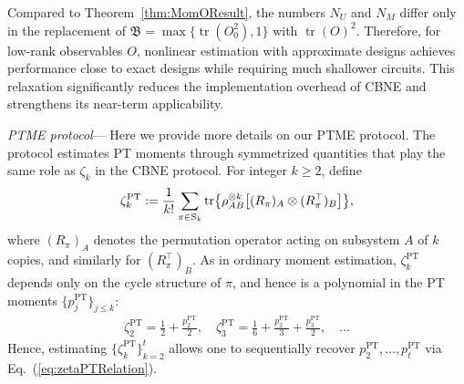\documentclass[aps,prl,twocolumn,nofootinbib,superscriptaddress,10pt]{revtex4-2}
\let\originalleft\left
\let\originalright\right
\renewcommand{\left}{\mathopen{}\mathclose\bgroup\originalleft}
\renewcommand{\right}{\aftergroup\egroup\originalright}
\DeclareMathOperator{\Tr}{tr}
\theoremstyle{plain}
\theoremstyle{definition}
\newcommand{\PT}{\mathrm{PT}}
\newcommand{\eref}[1]{Eq.~\textup{(\ref{#1})}}
\newcommand{\tref}[1]{Theorem~\ref{#1}}
\begin{document}
Compared to \tref{thm:MomOResult}, the numbers $N_U$ and $N_M$ differ only in the replacement of $\mathfrak{B} = \max \lbrace \Tr(O_0^2), 1\rbrace$ with $\Tr(O)^2$. Therefore, for low-rank observables $O$, %
nonlinear estimation with approximate designs achieves performance close to exact designs while requiring much shallower circuits.
This relaxation significantly reduces the implementation overhead of CBNE and strengthens its near-term applicability.



\emph{PTME protocol}--- 
Here we provide more details on our PTME protocol. 
The protocol estimates PT moments through symmetrized quantities that play the same role as \(\zeta_k\) in the CBNE protocol. 
For integer \(k\ge2\), define
\begin{equation}\label{eq:zetakPT}
	\zeta_k^{\PT}
    := \frac{1}{k!}\sum_{\pi\in \mathrm{S}_k}
	\Tr\left\{\rho_{AB}^{\otimes k} \left[(R_\pi)_A \otimes (R_\pi^{\top})_B\right]\right\},
\end{equation}
where $(R_\pi)_A$ denotes the permutation operator acting on subsystem $A$ of $k$ copies, and similarly for $(R_\pi^{\top})_B$. 
As in ordinary moment estimation, \(\zeta_k^{\PT}\) depends only on the cycle structure of \(\pi\), and hence is a polynomial in the PT moments \(\{p_j^{\PT}\}_{j\le k}\):
\begin{align}\label{eq:zetaPTRelation}
\zeta_2^{\PT}= \frac{1}{2}+\frac{p_2^{\PT}}{2}, \quad  
\zeta_3^{\PT}= \frac{1}{6}+\frac{p_2^{\PT}}{3}+\frac{p_3^{\PT}}{2}, \quad  \dots 
\end{align}
Hence, estimating $\{\zeta_k^{\PT}\}_{k=2}^t$ allows one to sequentially recover $p_2^{\PT},\dots,p_t^{\PT}$ via \eref{eq:zetaPTRelation}.
\end{document}
